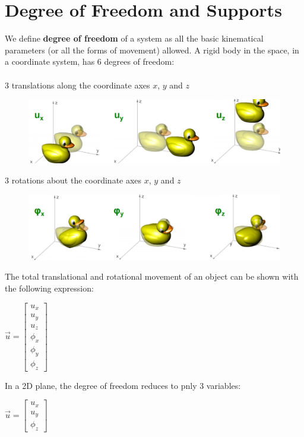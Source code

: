 \documentclass[class=report, crop=false, 12pt,a4paper]{standalone}
\begin{document}
\section{Degree of Freedom and Supports}
We define \textbf{degree of freedom} of a system as all the basic kinematical parameters (or all the forms of movement) allowed. A rigid body in the space, in a coordinate system, has 6 degrees of freedom: \\\\
3 translations along the coordinate axes $x$, $y$ and $z$
\begin{figure}[H]
  \centering
  \includegraphics[width = 0.9 \textwidth]{../img/axistranslations.PNG}
\end{figure}
3 rotations about the coordinate axes $x$, $y$ and $z$
\begin{figure}[H]
  \centering
  \includegraphics[width = 0.9 \textwidth]{../img/axisrotations.PNG}
\end{figure}
The total translational and rotational movement of an object can be shown with the following expression:
\begin{center}
  $\vec{u} = \left[ \begin{array}{cccccc} u_x \\ u_y \\ u_z \\ \phi_x \\ \phi_y \\ \phi_z \end{array}\right]$
\end{center}
In a 2D plane, the degree of freedom reduces to pnly 3 variables:
\begin{center}
  $\vec{u} = \left[ \begin{array}{ccc} u_x \\ u_y \\ \phi_z \end{array}\right]$
\end{center}
\end{document}

